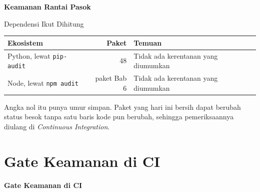 \documentclass[aspectratio=169, table, 12pt]{beamer}
\begin{document}
\begin{frame}{\hfill}
  \centering
  \Huge{\textbf{Keamanan Rantai Pasok}}
\end{frame}

\begin{frame}{{\Large Dependensi Ikut Dihitung}}
  \vspace{6pt}
  \centering
  {\footnotesize
  \begin{tabularx}{\textwidth}{lrY}
    \hline
    \textbf{Ekosistem} & \textbf{Paket} & \textbf{Temuan} \\
    \hline
    Python, lewat \texttt{pip-audit} & 48 & Tidak ada kerentanan yang diumumkan \\
    \hline
    Node, lewat \texttt{npm audit} & paket Bab 6 & Tidak ada kerentanan yang diumumkan \\
    \hline
  \end{tabularx}}

  \vspace{8pt}
  {\small Angka nol itu punya umur simpan. Paket yang hari ini bersih dapat
  berubah status besok tanpa satu baris kode pun berubah, sehingga
  pemeriksaannya diulang di \textit{Continuous Integration}.}
\end{frame}

\section{Gate Keamanan di CI}

\begin{frame}{\hfill}
  \centering
  \Huge{\textbf{Gate Keamanan di CI}}
\end{frame}
\end{document}
